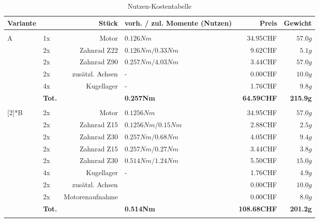     \begin{longtable}{p{0.5cm}p{0.8cm}rp{3cm}rr}
    \caption{Nutzen-Kostentabelle ...}
    \endfoot
    \caption{Nutzen-Kostentabelle}
    \label{tab:addlabel}
    \endlastfoot
    \textbf{Variante} & \multicolumn{2}{r}{\textbf{Stück}} & \textbf{vorh. / zul. Momente (Nutzen)} & \textbf{Preis} & \textbf{Gewicht} \\\hline
          &       &                 &                      &          &  \\
    \multirow{6}[2]{*}{A}
          & 1x    & Motor           & $0.126 Nm$           & 34.95CHF & $57.0 g$ \\
          & 2x    & Zahnrad Z22     & $0.126 Nm / 0.33 Nm$ &  9.62CHF & $5.1 g$  \\
          & 2x    & Zahnrad Z90     & $0.257 Nm / 4.03 Nm$ &  3.44CHF & $57.0 g$ \\
          & 2x    & zusätzl. Achsen & -                    &  0.00CHF & $10.0 g$ \\
          & 4x    & Kugellager      & -                    &  1.76CHF & $9.8 g$  \\
          & \textbf{Tot.} &  & \textbf{0.257Nm} & \textbf{64.59CHF} & \textbf{215.9g} \\
          &       &                 &                      &          &  \\
          \newpage
    \multirow{8}[2]{*}{B}
          & 2x    & Motor           & $0.1256 Nm$          & 34.95CHF & $57.0 g$ \\
          & 2x    & Zahnrad Z15     & $0.1256 Nm / 0.15 Nm$& 2.88CHF  & $2.5 g$  \\
          & 2x    & Zahnrad Z30     & $0.257 Nm / 0.68 Nm$ & 4.05CHF  & $9.4 g$  \\
          & 2x    & Zahnrad Z15     & $0.257 Nm / 0.27 Nm$ & 3.44CHF  & $3.8 g$  \\
          & 2x    & Zahnrad Z30     & $0.514 Nm / 1.24 Nm$ & 5.50CHF  & $15.0 g$ \\
          & 4x    & Kugellager      & -                    & 1.76CHF  & $4.9 g$  \\
          & 2x    & zusätzl. Achsen &                      & 0.00CHF  & $10.0 g$ \\
          & 2x    & Motorenaufnahme &                      & 0.00CHF  & $8.0 g$  \\
          & \textbf{Tot.} &       & \textbf{0.514Nm} & \textbf{108.68CHF} & \textbf{201.2g} \\
          &       &                 &                      &          &  \\

\end{longtable}
